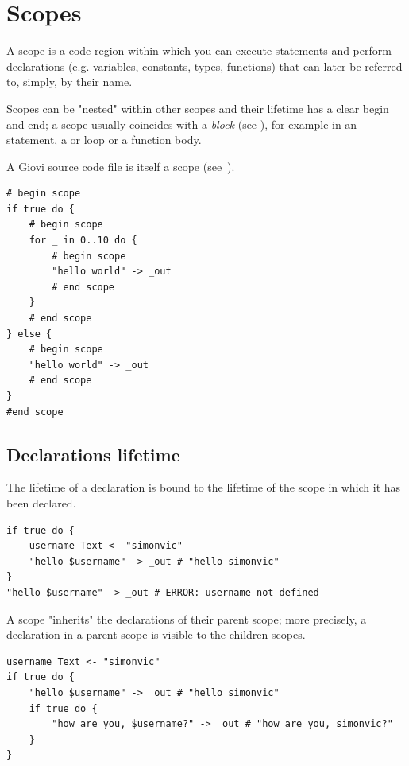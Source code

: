 \chapter{Scopes}
\label{ch:scopes}

A scope is a code region within which you can execute statements and perform
declarations (e.g. variables, constants, types, functions) that can later be
referred to, simply, by their name.

Scopes can be "nested" within other scopes and their lifetime has a clear begin
and end; a scope usually coincides with a \textit{block} (see
), for example in an  statement, a  or
 loop or a function body.

A Giovi source code file is itself a scope (see~).

\begin{listing}
	\label{lst:scope_lifetype}
	\caption{Example of nested scopes and their "lifetime"}
	\begin{verbatim}
# begin scope
if true do {
	# begin scope
	for _ in 0..10 do {
		# begin scope
		"hello world" -> _out
		# end scope
	}
	# end scope
} else {
	# begin scope
	"hello world" -> _out
	# end scope
}
#end scope
	\end{verbatim}
\end{listing}

\clearpage

\section{Declarations lifetime} The lifetime of a declaration is bound to
the lifetime of the scope in which it has been declared.

\begin{verbatim}
if true do {
	username Text <- "simonvic"
	"hello $username" -> _out # "hello simonvic"
}
"hello $username" -> _out # ERROR: username not defined
\end{verbatim}

A scope "inherits" the declarations of their parent scope; more precisely, a
declaration in a parent scope is visible to the children scopes.

\begin{verbatim}
username Text <- "simonvic"
if true do {
	"hello $username" -> _out # "hello simonvic"
	if true do {
		"how are you, $username?" -> _out # "how are you, simonvic?"
	}
}
\end{verbatim}

